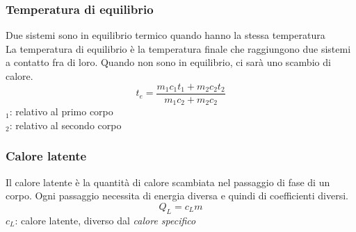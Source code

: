 \subsubsection{Temperatura di equilibrio}
Due sistemi sono in equilibrio termico quando hanno la stessa temperatura\\
La temperatura di equilibrio è la temperatura finale che raggiungono due sistemi a contatto fra di 
loro. Quando non sono in equilibrio, ci sarà uno scambio di calore.
\begin{equation*}
  t_e = \frac{m_1c_1t_1 + m_2c_2t_2}{m_1c_2 + m_2c_2}
\end{equation*}
$_1$: relativo al primo corpo\\
$_2$: relativo al secondo corpo

\subsubsection{Calore latente}
Il calore latente è la quantità di calore scambiata nel passaggio di fase di un corpo. Ogni 
passaggio necessita di energia diversa e quindi di coefficienti diversi.
\begin{equation*}
  Q_L = c_Lm
\end{equation*}
$c_L$: calore latente, diverso dal \emph{calore specifico}

